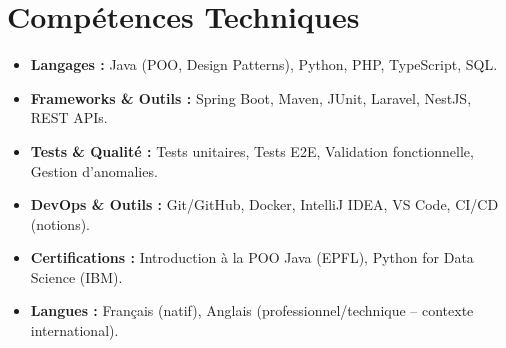 \documentclass[a4paper,11pt]{article}
\begin{document}
\section{Compétences Techniques}
\begin{itemize}[leftmargin=*, nosep]
    \item \small{\textbf{Langages :} Java (POO, Design Patterns), Python, PHP, TypeScript, SQL.}
    \item \small{\textbf{Frameworks \& Outils :} Spring Boot, Maven, JUnit, Laravel, NestJS, REST APIs.}
    \item \small{\textbf{Tests \& Qualité :} Tests unitaires, Tests E2E, Validation fonctionnelle, Gestion d'anomalies.}
    \item \small{\textbf{DevOps \& Outils :} Git/GitHub, Docker, IntelliJ IDEA, VS Code, CI/CD (notions).}
    \item \small{\textbf{Certifications :} Introduction à la POO Java (EPFL), Python for Data Science (IBM).}
    \item \small{\textbf{Langues :} Français (natif), Anglais (professionnel/technique -- contexte international).}
\end{itemize}

\end{document}
